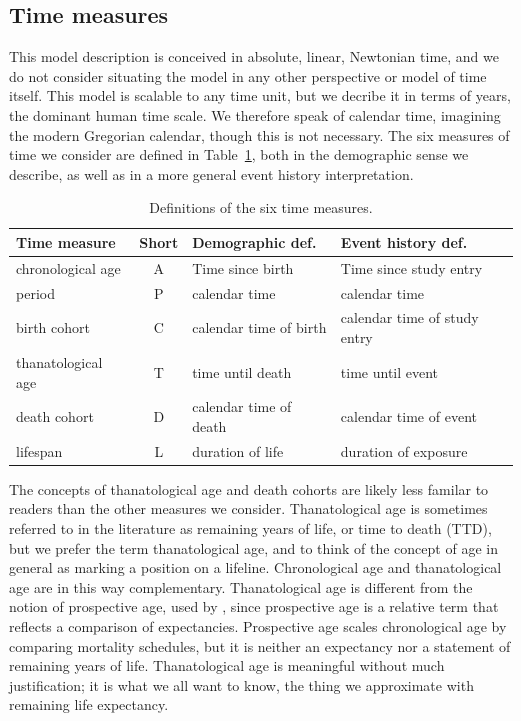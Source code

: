 \documentclass[11pt,oneside,a4paper]{article} %
\begin{document}
\subsection*{Time measures}
This model description is conceived in absolute, linear, Newtonian time, and we
do not consider situating the model in any other perspective or model of time
itself.
This model is scalable to any time unit, but we decribe it in terms of years,
the dominant human time scale. We therefore speak of calendar time,
imagining the modern Gregorian calendar, though this is not necessary. The six
measures of time we consider are defined in Table~\ref{tab:sixdefs}, both in the
demographic sense we describe, as well as in a more general event history
interpretation.

\begin{table}
\centering
\caption{Definitions of the six time measures.}
\label{tab:sixdefs}
\begin{tabular}{lcll}
\hline 
\textbf{Time measure} & \textbf{Short} & \textbf{Demographic def.} &
\textbf{Event history def.}\\
\hline 
chronological age & A & Time since birth & Time since study entry \\
period & P & calendar time & calendar time \\
birth cohort & C & calendar time of birth & calendar time of study entry \\
thanatological age & T & time until death & time until event \\
death cohort & D & calendar time of death & calendar time of event \\
lifespan & L & duration of life & duration of exposure \\
\end{tabular}
\end{table}

The concepts of thanatological age and death cohorts are likely less familar to
readers than the other measures we consider. Thanatological age is sometimes
referred to in the literature as remaining years of life, or time to death
(TTD), but we prefer the term thanatological age, and to think of the concept of
age in general as marking a position on a lifeline. Chronological age and
thanatological age are in this way complementary. Thanatological age is
different from the notion of prospective age, used by
\citet{sanderson2007new}, since prospective age is a relative term that reflects
a comparison of expectancies. Prospective age scales chronological age by
comparing mortality schedules, but it is neither an expectancy nor a statement
of remaining years of life. Thanatological age is meaningful without much
justification; it is what we all want to know, the thing we approximate with
remaining life expectancy.
\end{document}
